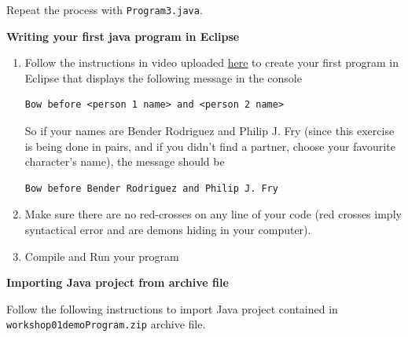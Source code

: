 \begin{questions}
Repeat the process with \texttt{Program3.java}.

\question \textbf{Writing your first java program in Eclipse} \vskip 0.5cm

\begin{enumerate}
\item Follow the instructions in video uploaded \href{https://www.youtube.com/watch?v=8DcIQcmwuSE}{here} to create your first program in Eclipse that displays the following message in the console

\begin{verbatim}
Bow before <person 1 name> and <person 2 name>
\end{verbatim}

So if your names are Bender Rodriguez and Philip J. Fry (since this exercise is being done in pairs, and if you didn't find a partner, choose your favourite character's name), the message should be

\begin{verbatim}
Bow before Bender Rodriguez and Philip J. Fry
\end{verbatim}

\item Make sure there are no red-crosses on any line of your code (red crosses imply syntactical error and are demons hiding in your computer).

\item Compile and Run your program
\end{enumerate}

\newpage
\question \textbf{Importing Java project from archive file} \vskip 0.5cm

Follow the following instructions to import Java project contained in \texttt{workshop01demoProgram.zip} archive file.


\end{questions}
